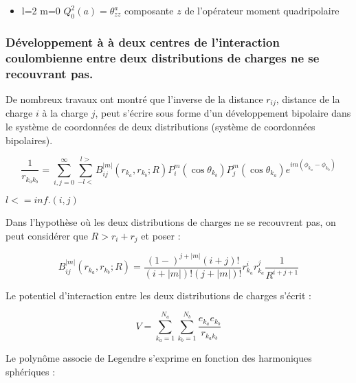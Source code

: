 	\begin{itemize}
		\item l=2 m=0 \hspace{1cm} $Q_{0}^{2}(a) = \theta_{zz}^{a}$ \hspace{1cm} composante $z$ de l'opérateur moment quadripolaire 
	\end{itemize}
	
	\subsubsection{Développement à à deux centres de l'interaction coulombienne entre deux distributions de charges ne se recouvrant pas.}
	
	De nombreux travaux \cite{buehler1951bipolar,hylleraas1931elektronenterme,proctor1977long,davison1968atomic} ont montré que l'inverse de la distance $r_{ij}$, distance de la charge $i$ à la charge $j$, peut s'écrire sous forme d'un développement bipolaire dans le système de coordonnées de deux distributions (système de coordonnées bipolaires).
	
	\begin{equation}
	\frac{1}{r_{k_{a}k_{b}}} = \sum_{i,j=0}^{\infty} \sum_{-l<}^{l>} B_{ij}^{|m|}(r_{k_{a}}, r_{k_{b}}; R) P_{i}^{m} (\cos\theta_{k_{b}}) P_{j}^{m}(\cos\theta_{k_{a}}) e^{im(\phi_{k_{a}}-\phi_{k_{b}})}
	\end{equation}
	
	$l< = inf.(i,j)$
	
	
	Dans l'hypothèse où les deux distributions de charges ne se recouvrent pas, on peut considérer que $R> r_{i} +r_{j}$ et poser : 
	
	\begin{equation}
	B_{ij}^{|m|}(r_{k_{a}}, r_{k_{b}}; R) = \frac{(1-)^{j+|m|} (i+j)!}{(i+|m|)! (j+|m|)!} r^{i}_{k_{a}} r_{k_{a}}^{j} \frac{1}{R^{i+j+1}}
	\end{equation}
	
	Le potentiel d'interaction entre les deux distributions de charges s'écrit : 
	
	\begin{equation}
	V = \sum_{k_{a}=1}^{N_{a}} \sum_{k_{b}=1}^{N_{b}} \frac{e_{k_{a}}e_{k_{b}}}{r_{k_{a}k_{b}}}
	\end{equation}
	
	
	Le polynôme associe de Legendre s'exprime en fonction des harmoniques sphériques : 
	
